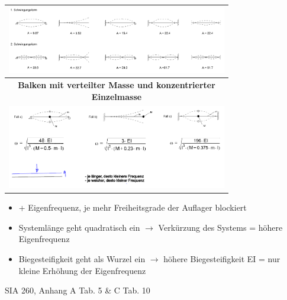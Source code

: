 \begin{minipage}{\linewidth}
\begin{tabular}{l|l|p{0.25\linewidth}p{0.5\linewidth}}
			\multicolumn{4}{c}{\includegraphics[width=\linewidth]{images/Schwingung2Schwingungsform.PNG} } \\ \hline
			
			\multicolumn{4}{c}{\textbf{Balken mit verteilter Masse und konzentrierter Einzelmasse } } \\ \hline
			
			\multicolumn{4}{c}{ \includegraphics[width=0.8\linewidth]{images/Schwingung3Schwingungsform.PNG} } \\ \hline
		
		\end{tabular}
		
	\end{minipage}
	\begin{minipage}{0.5\linewidth}
		
		\begin{itemize}
			\item + Eigenfrequenz, je mehr Freiheitsgrade der Auflager blockiert
			
			\item Systemlänge geht quadratisch ein $ \rightarrow $ Verkürzung des Systems = höhere Eigenfrequenz
			
			\item Biegesteifigkeit geht als Wurzel ein $ \rightarrow $ höhere Biegesteifigkeit EI = nur kleine Erhöhung der Eigenfrequenz
			
		\end{itemize}
		
	\end{minipage}
	\begin{minipage}{0.5\linewidth}
		 \hspace{1cm} SIA 260, Anhang A Tab. 5 \& C Tab. 10 \\
		
	\end{minipage}